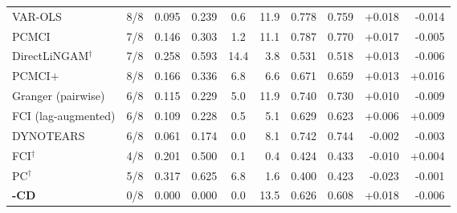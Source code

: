 \begin{table}[t]
\begin{tabular}{@{}lccccrrrrr@{}}
VAR-OLS & 8/8 & 0.095 & 0.239 & 0.6 & 11.9 & 0.778 & 0.759 & +0.018 & -0.014 \\
PCMCI & 7/8 & 0.146 & 0.303 & 1.2 & 11.1 & 0.787 & 0.770 & +0.017 & -0.005 \\
DirectLiNGAM$^{\dagger}$ & 7/8 & 0.258 & 0.593 & 14.4 & 3.8 & 0.531 & 0.518 & +0.013 & -0.006 \\
PCMCI$+$ & 8/8 & 0.166 & 0.336 & 6.8 & 6.6 & 0.671 & 0.659 & +0.013 & +0.016 \\
Granger (pairwise) & 6/8 & 0.115 & 0.229 & 5.0 & 11.9 & 0.740 & 0.730 & +0.010 & -0.009 \\
FCI (lag-augmented) & 6/8 & 0.109 & 0.228 & 0.5 & 5.1 & 0.629 & 0.623 & +0.006 & +0.009 \\
DYNOTEARS & 6/8 & 0.061 & 0.174 & 0.0 & 8.1 & 0.742 & 0.744 & -0.002 & -0.003 \\
FCI$^{\dagger}$ & 4/8 & 0.201 & 0.500 & 0.1 & 0.4 & 0.424 & 0.433 & -0.010 & +0.004 \\
PC$^{\dagger}$ & 5/8 & 0.317 & 0.625 & 6.8 & 1.6 & 0.400 & 0.423 & -0.023 & -0.001 \\
\midrule
\textbf{\cafe{}-CD} & 0/8 & 0.000 & 0.000 & 0.0 & 13.5 & 0.626 & 0.608 & +0.018 & -0.006 \\
\bottomrule
\end{tabular}
\end{table}
